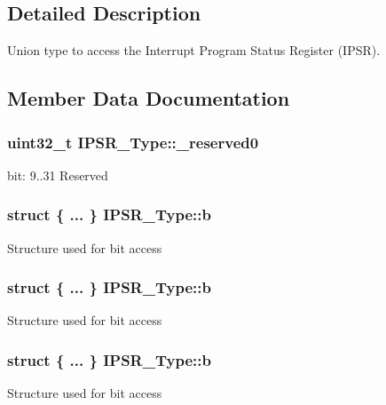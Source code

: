 \subsection{Detailed Description}
Union type to access the Interrupt Program Status Register (I\+P\+SR). 

\subsection{Member Data Documentation}
\subsubsection[{\texorpdfstring{\+\_\+reserved0}{_reserved0}}]{\setlength{\rightskip}{0pt plus 5cm}uint32\+\_\+t I\+P\+S\+R\+\_\+\+Type\+::\+\_\+reserved0}\hypertarget{union_i_p_s_r___type_ad2eb0a06de4f03f58874a727716aa9aa}{}\label{union_i_p_s_r___type_ad2eb0a06de4f03f58874a727716aa9aa}
bit\+: 9..31 Reserved 
\subsubsection[{\texorpdfstring{b}{b}}]{\setlength{\rightskip}{0pt plus 5cm}struct \{ ... \}   I\+P\+S\+R\+\_\+\+Type\+::b}\hypertarget{union_i_p_s_r___type_ae5c412629d57f2e6577ffd5f8845e007}{}\label{union_i_p_s_r___type_ae5c412629d57f2e6577ffd5f8845e007}
Structure used for bit access 
\subsubsection[{\texorpdfstring{b}{b}}]{\setlength{\rightskip}{0pt plus 5cm}struct \{ ... \}   I\+P\+S\+R\+\_\+\+Type\+::b}\hypertarget{union_i_p_s_r___type_abd53ffd90d51de077cf171095016c1f4}{}\label{union_i_p_s_r___type_abd53ffd90d51de077cf171095016c1f4}
Structure used for bit access 
\subsubsection[{\texorpdfstring{b}{b}}]{\setlength{\rightskip}{0pt plus 5cm}struct \{ ... \}   I\+P\+S\+R\+\_\+\+Type\+::b}\hypertarget{union_i_p_s_r___type_a8694433a871ae74beeb7aa9abeea37bb}{}\label{union_i_p_s_r___type_a8694433a871ae74beeb7aa9abeea37bb}
Structure used for bit access 
